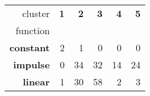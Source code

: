 \begin{tabular}{r|rrrrr}
cluster & \textbf{1} & \textbf{2} & \textbf{3} & \textbf{4} & \textbf{5} \\
function &  &  &  &  &  \\
\hline
\textbf{constant} & {\cellcolor[HTML]{023858}} \color[HTML]{F1F1F1} 2 & {\cellcolor[HTML]{73A9CF}} \color[HTML]{F1F1F1} 1 & {\cellcolor[HTML]{FFF7FB}} \color[HTML]{000000} 0 & {\cellcolor[HTML]{FFF7FB}} \color[HTML]{000000} 0 & {\cellcolor[HTML]{FFF7FB}} \color[HTML]{000000} 0 \\
\textbf{impulse} & {\cellcolor[HTML]{FFF7FB}} \color[HTML]{000000} 0 & {\cellcolor[HTML]{023858}} \color[HTML]{F1F1F1} 34 & {\cellcolor[HTML]{034871}} \color[HTML]{F1F1F1} 32 & {\cellcolor[HTML]{97B7D7}} \color[HTML]{000000} 14 & {\cellcolor[HTML]{167BB6}} \color[HTML]{F1F1F1} 24 \\
\textbf{linear} & {\cellcolor[HTML]{FFF7FB}} \color[HTML]{000000} 1 & {\cellcolor[HTML]{6FA7CE}} \color[HTML]{F1F1F1} 30 & {\cellcolor[HTML]{023858}} \color[HTML]{F1F1F1} 58 & {\cellcolor[HTML]{FDF5FA}} \color[HTML]{000000} 2 & {\cellcolor[HTML]{FAF3F9}} \color[HTML]{000000} 3 \\
\end{tabular}

